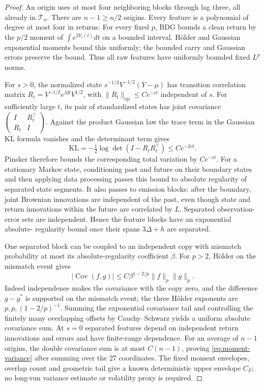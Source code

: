 \documentclass[11pt,a4paper]{amsart}
\theoremstyle{plain}
\theoremstyle{definition}
\theoremstyle{remark}
\DeclareMathOperator{\Cov}{Cov}
\newcommand{\R}{\mathbb{R}}
\begin{document}
\begin{proof}
An origin uses at most four neighboring blocks through lag three, all
already in $\mathcal T_n$. There are $n-1\ge n/2$ origins. Every feature
is a polynomial of degree at most four in returns. For every fixed $p$,
BDG bounds a clean return by the $p/2$ moment of
$\int e^{2Y_i(t)}dt$ on a bounded interval. H\"older and Gaussian
exponential moments bound this uniformly; the bounded carry and Gaussian
errors preserve the bound. Thus all raw features have uniformly bounded
fixed $L^p$ norms.

For $s>0$, the normalized state
$s^{-1/2}V^{-1/2}(Y-\mu)$ has transition correlation matrix
$R_t=V^{-1/2}e^{Mt}V^{1/2}$, with
$\|R_t\|_{\mathrm{op}}\le Ce^{-ct}$ independent of $s$. For sufficiently
large $t$, its pair of standardized states has joint covariance
$\left(\begin{smallmatrix}I&R_t^\top\\R_t&I\end{smallmatrix}\right)$.
Against the product Gaussian law the trace term in the Gaussian KL formula
vanishes and the determinant term gives
\[
 \mathrm{KL}=-\tfrac12\log\det(I-R_tR_t^\top)\le Ce^{-2ct}.
\]
Pinsker therefore bounds the corresponding total variation by $Ce^{-ct}$.
For a stationary Markov state, conditioning past and future on their
boundary states and then applying data processing passes this bound to
absolute regularity of separated state segments. It also passes to
emission blocks: after the boundary, joint Brownian innovations are
independent of the past, even though state and return innovations within
the future are correlated by $L$. Separated observation-error sets are
independent. Hence the feature blocks have an exponential absolute-
regularity bound once their spans $3\Delta+h$ are separated.

One separated block can be coupled to an independent copy with
mismatch probability at most its absolute-regularity coefficient $\beta$.
For $p>2$, H\"older on the mismatch event gives
\[
 |\Cov(f,g)|\le C\beta^{1-2/p}\|f\|_p\|g\|_p.
\]
Indeed independence makes the covariance with the copy zero, and the
difference $g-g^*$ is supported on the mismatch event; the three
H\"older exponents are $p,p,(1-2/p)^{-1}$.
Summing the exponential covariance tail and controlling the finitely
many overlapping offsets by Cauchy--Schwarz yields a uniform absolute
covariance sum. At $s=0$ separated features depend on independent return
innovations and errors and have finite-range dependence. For an average
of $n-1$ origins, the double covariance sum is at most $C(n-1)$, proving
\eqref{eq:moment-variance} after summing over the 27 coordinates.
The fixed moment envelopes, overlap count and geometric tail give a
known deterministic upper envelope $C_F$; no long-run variance estimate
or volatility proxy is required.
\end{proof}
\end{document}
